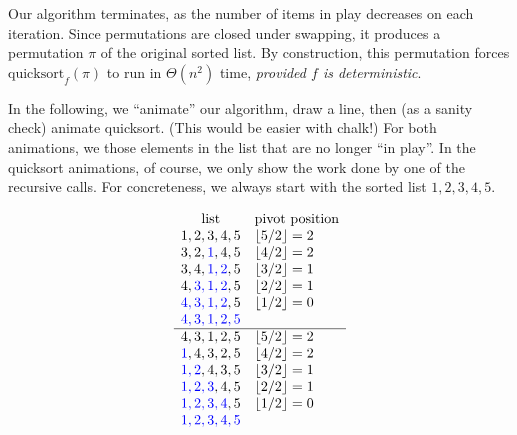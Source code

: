 \documentclass[a4paper]{article}
\newcommand*{\floor}[1]{\left\lfloor{#1}\right\rfloor}
\begin{document}
Our algorithm terminates, as the number of items in play decreases on each iteration.
Since permutations are closed under swapping, it produces a permutation $\pi$ of the original sorted list.
By construction, this permutation forces $\text{quicksort}_{f}(\pi)$ to run in $\Theta(n^2)$ time, \emph{provided $f$ is deterministic}.

In the following, we ``animate'' our algorithm, draw a line, then (as a sanity check) animate quicksort.
(This would be easier with chalk!)
For both animations, we  those elements in the list that are no longer ``in play''.
In the quicksort animations, of course, we only show the work done by one of the recursive calls.
For concreteness, we always start with the sorted list $1, 2, 3, 4, 5$.

	\[
		\begin{array}{cl}
		\text{list} & \text{pivot position} \\
		1, 2, 3, 4, 5	&\floor{5/2} = 2\\
		3, 2, \USED{1}, 4, 5	&\floor{4/2} = 2 \\
		3, 4, \USED{1, 2}, 5	&\floor{3/2} = 1 \\
		4, \USED{3, 1, 2}, 5	&\floor{2/2} = 1 \\
		\USED{4, 3, 1, 2}, 5	&\floor{1/2} = 0 \\
		\USED{4, 3, 1, 2, 5}	\\\hline
		4, 3, 1, 2, 5	& \floor{5/2} = 2 \\
		\USED{1}, 4, 3, 2, 5	&\floor{4/2} = 2 \\
		\USED{1, 2}, 4, 3, 5	&\floor{3/2} = 1 \\
		\USED{1, 2, 3}, 4, 5	&\floor{2/2} = 1 \\
		\USED{1, 2, 3, 4}, 5	&\floor{1/2} = 0 \\
		\USED{1, 2, 3, 4, 5}
		\end{array}
	\]
\end{document}
